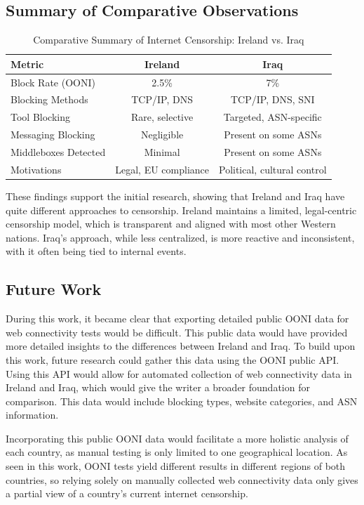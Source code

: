 \subsection{Summary of Comparative Observations}

\begin{table}[H]
\centering
\caption{Comparative Summary of Internet Censorship: Ireland vs. Iraq}
\begin{tabular}{lcc}
\toprule
\textbf{Metric} & \textbf{Ireland} & \textbf{Iraq} \\
\midrule
Block Rate (OONI) & 2.5\% & 7\% \\
Blocking Methods & TCP/IP, DNS & TCP/IP, DNS, SNI \\
Tool Blocking & Rare, selective & Targeted, ASN-specific \\
Messaging Blocking & Negligible & Present on some ASNs \\
Middleboxes Detected & Minimal & Present on some ASNs \\
Motivations & Legal, EU compliance & Political, cultural control \\
\bottomrule
\end{tabular}
\label{tab:comparison_summary}
\end{table}

These findings support the initial research, showing that Ireland and Iraq have quite different approaches to censorship. Ireland maintains a limited, legal-centric censorship model, which is transparent and aligned with most other Western nations. Iraq's approach, while less centralized, is more reactive and inconsistent, with it often being tied to internal events. 

\subsection{Future Work}

During this work, it became clear that exporting detailed public OONI data for web connectivity tests would be difficult. This public data would have provided more detailed insights to the differences between Ireland and Iraq. To build upon this work, future research could gather this data using the OONI public API. Using this API would allow for automated collection of web connectivity data in Ireland and Iraq, which would give the writer a broader foundation for comparison. This data would include blocking types, website categories, and ASN information.

Incorporating this public OONI data would facilitate a more holistic analysis of each country, as manual testing is only limited to one geographical location. As seen in this work, OONI tests yield different results in different regions of both countries, so relying solely on manually collected web connectivity data only gives a partial view of a country's current internet censorship. 